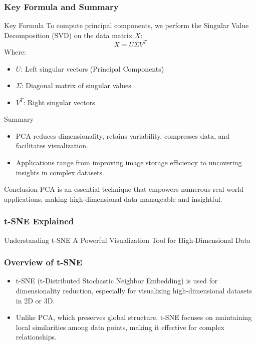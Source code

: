 \documentclass[aspectratio=169]{beamer}
\begin{document}
\begin{frame}[fragile]
    \frametitle{Key Formula and Summary}
    \begin{block}{Key Formula}
        To compute principal components, we perform the Singular Value Decomposition (SVD) on the data matrix $X$:
        \begin{equation}
            X = U \Sigma V^T
        \end{equation}
        Where:
        \begin{itemize}
            \item $U$: Left singular vectors (Principal Components)
            \item $\Sigma$: Diagonal matrix of singular values
            \item $V^T$: Right singular vectors
        \end{itemize}
    \end{block}

    \begin{block}{Summary}
        \begin{itemize}
            \item PCA reduces dimensionality, retains variability, compresses data, and facilitates visualization.
            \item Applications range from improving image storage efficiency to uncovering insights in complex datasets.
        \end{itemize}
    \end{block}

    \begin{block}{Conclusion}
        PCA is an essential technique that empowers numerous real-world applications, making high-dimensional data manageable and insightful.
    \end{block}
\end{frame}

\begin{frame}
    \frametitle{t-SNE Explained}
    \begin{block}{Understanding t-SNE}
        A Powerful Visualization Tool for High-Dimensional Data
    \end{block}
\end{frame}

\begin{frame}
    \frametitle{Overview of t-SNE}
    \begin{itemize}
        \item t-SNE (t-Distributed Stochastic Neighbor Embedding) is used for dimensionality reduction, especially for visualizing high-dimensional datasets in 2D or 3D.
        \item Unlike PCA, which preserves global structure, t-SNE focuses on maintaining local similarities among data points, making it effective for complex relationships.
    \end{itemize}
\end{frame}
\end{document}
